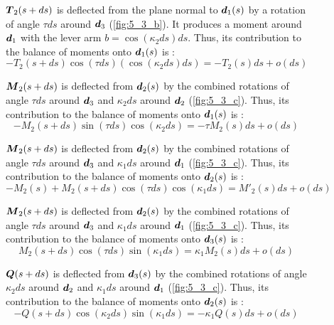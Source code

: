 \begin{figure}[p]
\begin{fullpage}
	$\boldsymbol{T}_2(s+ds)$ is deflected from the plane normal to $\boldsymbol{d}_1(s)$ by a rotation of angle $\tau ds$ around $\boldsymbol{d}_3$ (\cref{fig:5_3_b}). It produces a moment around $\boldsymbol{d}_1$ with the lever arm $b =  \cos(\kappa_2 ds) ds$. Thus, its contribution to the balance of moments onto $\boldsymbol{d}_1(s)$ is : 
	\begin{equation*}
		-T_2(s+ds) \cos(\tau ds) (\cos(\kappa_2 ds) ds) = -T_2(s) ds + o(ds)
	\end{equation*}
	
	$\boldsymbol{M}_2(s+ds)$ is deflected from $\boldsymbol{d}_2(s)$ by the combined rotations of angle $\tau ds$ around $\boldsymbol{d}_3$ and $\kappa_2 ds$ around $\boldsymbol{d}_2$ (\cref{fig:5_3_c}). Thus, its contribution to the balance of moments onto $\boldsymbol{d}_1(s)$ is : 
	\begin{equation*}
		-M_2(s+ds) \sin(\tau ds) \cos(\kappa_2 ds) = -\tau M_2 (s) ds + o(ds)
	\end{equation*}	
	
	$\boldsymbol{M}_2(s+ds)$ is deflected from $\boldsymbol{d}_2(s)$ by the combined rotations of angle $\tau ds$ around $\boldsymbol{d}_3$ and $\kappa_1 ds$ around $\boldsymbol{d}_1$ (\cref{fig:5_3_c}). Thus, its contribution to the balance of moments onto $\boldsymbol{d}_2(s)$ is : 
	\begin{equation*}
		-M_2(s) + M_2(s+ds) \cos(\tau ds) \cos(\kappa_1 ds) = M'_2 (s) ds + o(ds)
	\end{equation*}
	
	$\boldsymbol{M}_2(s+ds)$ is deflected from $\boldsymbol{d}_2(s)$ by the combined rotations of angle $\tau ds$ around $\boldsymbol{d}_3$ and $\kappa_1 ds$ around $\boldsymbol{d}_1$ (\cref{fig:5_3_c}). Thus, its contribution to the balance of moments onto $\boldsymbol{d}_3(s)$ is : 
	\begin{equation*}
		M_2(s+ds) \cos(\tau ds) \sin(\kappa_1 ds) = \kappa_1 M_2 (s) ds + o(ds)
	\end{equation*}	
	
	$\boldsymbol{Q}(s+ds)$ is deflected from $\boldsymbol{d}_3(s)$ by the combined rotations of angle $\kappa_2 ds$ around $\boldsymbol{d}_2$ and $\kappa_1 ds$ around $\boldsymbol{d}_1$ (\cref{fig:5_3_c}). Thus, its contribution to the balance of moments onto $\boldsymbol{d}_2(s)$ is : 
	\begin{equation*}
		-Q(s+ds) \cos(\kappa_2 ds) \sin(\kappa_1 ds) = -\kappa_1 Q(s) ds + o(ds)
	\end{equation*}	
	  \end{fullpage}
\end{figure}

 
